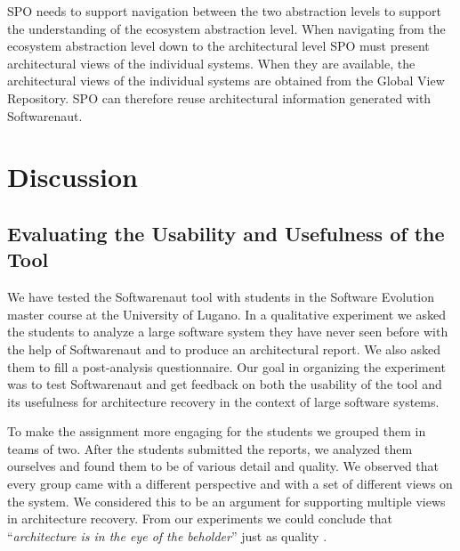 \documentclass[preprint,12pt]{elsarticle}
\begin{document}

SPO needs to support navigation between the two abstraction levels to support the understanding of  the ecosystem abstraction level. When navigating from the ecosystem abstraction level down to the architectural level SPO must present architectural views of the individual systems. When they are available, the architectural views of the individual systems are obtained from the Global View Repository. SPO can therefore reuse architectural information generated with Softwarenaut.




\newpage
\section {Discussion}
\label {sec:disc}

\subsection {Evaluating the Usability and Usefulness of the Tool}
We have tested the Softwarenaut tool with students in the Software Evolution master course at the University of Lugano. In a qualitative experiment we asked the students to analyze a large software system they have never seen before with the help of Softwarenaut and to produce an architectural report. We also asked them to fill a post-analysis questionnaire. Our goal in organizing the experiment was to test Softwarenaut and get feedback on both the usability of the tool and its usefulness for architecture recovery in the context of large software systems. 

To make the assignment more engaging for the students we grouped them in teams of two. After the students submitted the reports, we analyzed them ourselves and found them to be of various detail and quality. We observed that every group came with a different perspective and with a set of different views on the system. We considered this to be an argument for supporting multiple views in architecture recovery. From our experiments we could conclude that ``{\em architecture is in the eye of the beholder}'' just as quality \cite{bass-architecture}.
\end{document}

